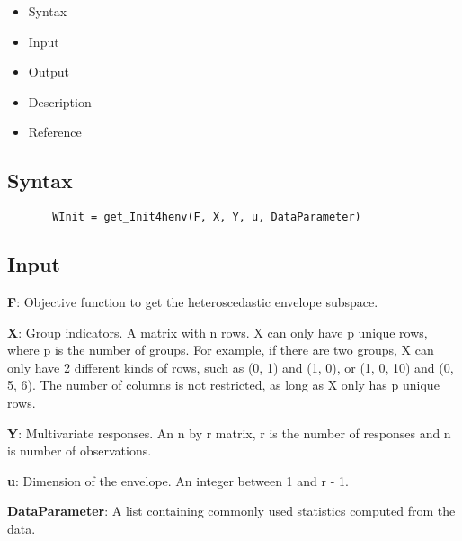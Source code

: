 \documentclass[a4paper,11pt,openany]{memoir}
\begin{document}
\begin{itemize}
\setlength{\itemsep}{-1ex}
   \item Syntax
   \item Input
   \item Output
   \item Description
   \item Reference
\end{itemize}


\subsection*{Syntax}


\begin{verbatim}       WInit = get_Init4henv(F, X, Y, u, DataParameter)\end{verbatim}
    

\subsection*{Input}

\begin{par}
\textbf{F}: Objective function to get the heteroscedastic envelope subspace.
\end{par} \vspace{1em}
\begin{par}
\textbf{X}: Group indicators. A matrix with n rows.  X can only have p unique  rows, where p is the number of groups. For example, if there are two groups, X can only have 2 different kinds of rows, such as (0, 1) and (1, 0), or (1, 0, 10) and (0, 5, 6).  The number of columns is not restricted, as long as X only has p unique rows.
\end{par} \vspace{1em}
\begin{par}
\textbf{Y}: Multivariate responses. An n by r matrix, r is the number of responses and n is number of observations.
\end{par} \vspace{1em}
\begin{par}
\textbf{u}: Dimension of the envelope. An integer between 1 and r - 1.
\end{par} \vspace{1em}
\begin{par}
\textbf{DataParameter}: A list containing commonly used statistics computed from the data.
\end{par} \vspace{1em}
\end{document}
